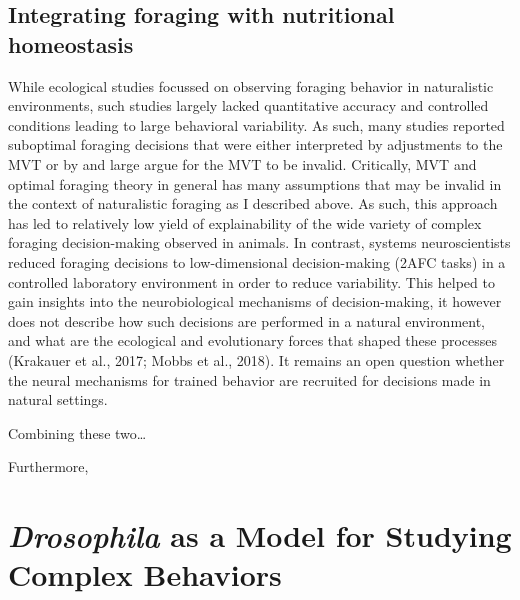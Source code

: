 \subsection{Integrating foraging with nutritional homeostasis}
\label{sub:integrativetheory}

While ecological studies focussed on observing foraging behavior in naturalistic environments, such studies largely lacked quantitative accuracy and controlled conditions leading to large behavioral variability. As such, many studies reported suboptimal foraging decisions that were either interpreted by adjustments to the MVT or by and large argue for the MVT to be invalid. Critically, MVT and optimal foraging theory in general has many assumptions that may be invalid in the context of naturalistic foraging as I described above. As such, this approach has led to relatively low yield of explainability of the wide variety of complex foraging decision-making observed in animals. In contrast, systems neuroscientists reduced foraging decisions to low-dimensional decision-making (2AFC tasks) in a controlled laboratory environment in order to reduce variability. This helped to gain insights into the neurobiological mechanisms of decision-making, it however does not describe how such decisions are performed in a natural environment, and what are the ecological and evolutionary forces that shaped these processes \needscite(Krakauer et al., 2017; Mobbs et al., 2018). It remains an open question whether the neural mechanisms for trained behavior are recruited for decisions made in natural settings.

Combining these two… 

Furthermore, 


\section{\textit{Drosophila} as a Model for Studying Complex Behaviors}
\label{sec:droso}

